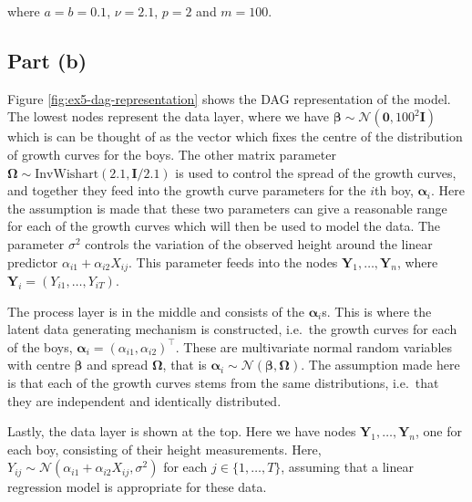 \documentclass[
]{homework}
\begin{document}
where \(a = b = 0.1\), \(\nu = 2.1\), \(p = 2\) and \(m = 100\).

\subsection{Part (b)}\label{part-b-4}

Figure \ref{fig:ex5-dag-representation} shows the DAG representation of the model. The lowest nodes represent the data layer, where we have \(\boldsymbol\beta \sim \mathcal N(\mathbf 0, 100^2 \mathbf I)\) which
is can be thought of as the vector which fixes the centre of the distribution of growth curves for the boys. The other matrix parameter \(\boldsymbol\Omega \sim \mathrm{InvWishart}(2.1, \mathbf I/2.1)\) is used to control the spread of the growth curves, and together they feed into the growth curve parameters for the \(i\)th boy, \(\boldsymbol\alpha_i\). Here the assumption is made that these two parameters can give a reasonable range for each of the growth curves which will then be used to model the data. The parameter \(\sigma^2\) controls the variation of the observed height around the linear predictor \(\alpha_{i1} + \alpha_{i2}X_{ij}\). This parameter feeds into the nodes \(\mathbf Y_1, \ldots, \mathbf Y_n\), where \(\mathbf Y_i = (Y_{i1}, \ldots, Y_{iT})\).

The process layer is in the middle and consists of the \(\boldsymbol\alpha_i\)s. This is where the latent data generating mechanism is constructed, i.e.~the growth curves for each of the boys, \(\boldsymbol\alpha_i = (\alpha_{i1}, \alpha_{i2})^\intercal\). These are multivariate normal random variables with centre \(\boldsymbol\beta\) and spread \(\boldsymbol\Omega\), that is \(\boldsymbol\alpha_i \sim \mathcal N(\boldsymbol\beta, \boldsymbol\Omega)\). The assumption made here is that each of the growth curves stems from the same distributions, i.e.~that they are independent and identically distributed.

Lastly, the data layer is shown at the top. Here we have nodes \(\mathbf Y_1, \ldots, \mathbf Y_n\), one for each boy, consisting of their height measurements. Here, \(Y_{ij} \sim \mathcal N\left(\alpha_{i1} + \alpha_{i2} X _{ij}, \sigma^2\right)\) for each \(j \in \{1, \ldots, T\}\), assuming that a linear regression model is appropriate for these data.
\end{document}
